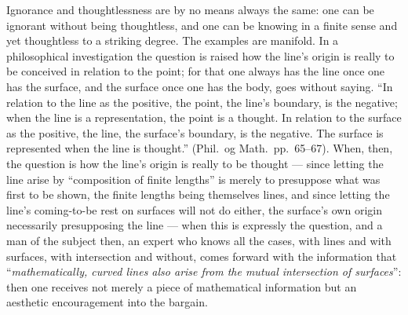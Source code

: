 \documentclass[12pt,a4paper]{book}
\begin{document}
Ignorance and thoughtlessness are by no means always the same: one can be
ignorant without being thoughtless, and one can be knowing in a finite sense
and yet thoughtless to a striking degree. The examples are manifold. In a
philosophical investigation the question is raised how the line's origin is
really to be conceived in relation to the point; for that one always has the
line once one has the surface, and the surface once one has the body, goes
without saying. ``In relation to the line as the positive, the point, the
line's boundary, is the negative; when the line is a representation, the point
is a thought. In relation to the surface as the positive, the line, the
surface's boundary, is the negative. The surface is represented when the line
is thought.'' (Phil.\ og Math.\ pp.~65--67). When, then, the question is how
the line's origin is really to be thought --- since letting the line arise by
``composition of finite lengths'' is merely to
presuppose what was first to be shown, the finite lengths being themselves
lines, and since letting the line's coming-to-be rest on surfaces will not do
either, the surface's own origin necessarily presupposing the line --- when
this is expressly the question, and a man of the subject then, an expert who
knows all the cases, with lines and with surfaces, with intersection and
without, comes forward with the information that ``\emph{mathematically, curved
lines also arise from the mutual intersection of surfaces}'': then one receives
not merely a piece of mathematical information but an aesthetic encouragement
into the bargain.
\end{document}
